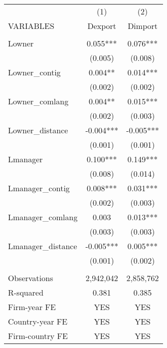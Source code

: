\begin{tabular}{lcc} \hline
 & (1) & (2) \\
VARIABLES & Dexport & Dimport \\ \hline
 &  &  \\
Lowner & 0.055*** & 0.076*** \\
 & (0.005) & (0.008) \\
Lowner\_contig & 0.004** & 0.014*** \\
 & (0.002) & (0.002) \\
Lowner\_comlang & 0.004** & 0.015*** \\
 & (0.002) & (0.003) \\
Lowner\_distance & -0.004*** & -0.005*** \\
 & (0.001) & (0.001) \\
Lmanager & 0.100*** & 0.149*** \\
 & (0.008) & (0.014) \\
Lmanager\_contig & 0.008*** & 0.031*** \\
 & (0.002) & (0.003) \\
Lmanager\_comlang & 0.003 & 0.013*** \\
 & (0.003) & (0.003) \\
Lmanager\_distance & -0.005*** & 0.005*** \\
 & (0.001) & (0.002) \\
 &  &  \\
Observations & 2,942,042 & 2,858,762 \\
R-squared & 0.381 & 0.385 \\
Firm-year FE & YES & YES \\
Country-year FE & YES & YES \\
 Firm-country FE & YES & YES \\ \hline
\end{tabular}
